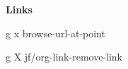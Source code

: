 \documentclass[10pt]{article}
\renewcommand\subsection[1]{\smallskip\par\textbf{\color{heading}#1}}
\begin{document}
\begin{multicols}{4}
  \subsection{Links}
  \begin{keylist}
    \item[g x] browse-url-at-point
    \item[g X] jf/org-link-remove-link
  \end{keylist}
\end{multicols}
\end{document}
